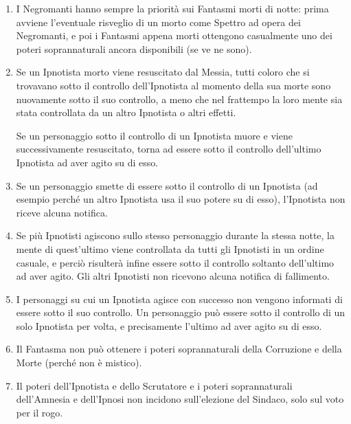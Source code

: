 \documentclass[a4paper,10pt]{article}
\begin{document}
\begin{enumerate}
	\item I Negromanti hanno sempre la priorità sui Fantasmi morti di notte: prima avviene l'eventuale risveglio di un morto come Spettro ad opera dei Negromanti, e poi i Fantasmi appena morti ottengono casualmente uno dei poteri soprannaturali ancora disponibili (se ve ne sono).

	\item Se un Ipnotista morto viene resuscitato dal Messia, tutti coloro che si trovavano sotto il controllo dell'Ipnotista al momento della sua morte sono nuovamente sotto il suo controllo, a meno che nel frattempo la loro mente sia stata controllata da un altro Ipnotista o altri effetti.
 
	Se un personaggio sotto il controllo di un Ipnotista muore e viene successivamente resuscitato, torna ad essere sotto il controllo dell'ultimo Ipnotista ad aver agito su di esso.
	
	\item Se un personaggio smette di essere sotto il controllo di un Ipnotista (ad esempio perché un altro Ipnotista usa il suo potere su di esso), l'Ipnotista non riceve alcuna notifica.
 
	\item Se più Ipnotisti agiscono sullo stesso personaggio durante la stessa notte, la mente di quest'ultimo viene controllata da tutti gli Ipnotisti in un ordine casuale, e perciò risulterà infine essere sotto il controllo soltanto dell'ultimo ad aver agito. Gli altri Ipnotisti non ricevono alcuna notifica di fallimento.
	
	\item I personaggi su cui un Ipnotista agisce con successo non vengono informati di essere sotto il suo controllo. Un personaggio può essere sotto il controllo di un solo Ipnotista per volta, e precisamente l'ultimo ad aver agito su di esso.
 
	\item Il Fantasma non può ottenere i poteri soprannaturali della Corruzione e della Morte (perché non è mistico).
 
	\item Il poteri dell'Ipnotista e dello Scrutatore e i poteri soprannaturali dell'Amnesia e dell'Ipnosi non incidono sull'elezione del Sindaco, solo sul voto per il rogo.
 

\end{enumerate}
\end{document}
